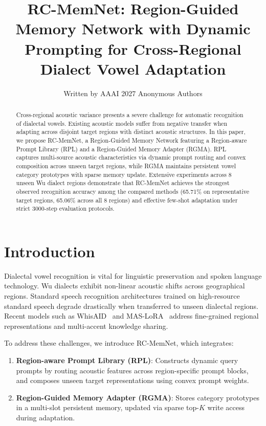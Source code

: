 \documentclass[letterpaper]{article}
\title{RC-MemNet: Region-Guided Memory Network with Dynamic Prompting for Cross-Regional Dialect Vowel Adaptation}
\author{
    Written by AAAI 2027 Anonymous Authors
}
\begin{document}
\maketitle

\begin{abstract}
Cross-regional acoustic variance presents a severe challenge for automatic recognition of dialectal vowels. Existing acoustic models suffer from negative transfer when adapting across disjoint target regions with distinct acoustic structures. In this paper, we propose RC-MemNet, a Region-Guided Memory Network featuring a Region-aware Prompt Library (RPL) and a Region-Guided Memory Adapter (RGMA). RPL captures multi-source acoustic characteristics via dynamic prompt routing and convex composition across unseen target regions, while RGMA maintains persistent vowel category prototypes with sparse memory update. Extensive experiments across 8 unseen Wu dialect regions demonstrate that RC-MemNet achieves the strongest observed recognition accuracy among the compared methods (65.71\% on representative target regions, 65.06\% across all 8 regions) and effective few-shot adaptation under strict 3000-step evaluation protocols.
\end{abstract}

\section{Introduction}
Dialectal vowel recognition is vital for linguistic preservation and spoken language technology. Wu dialects exhibit non-linear acoustic shifts across geographical regions. Standard speech recognition architectures trained on high-resource standard speech degrade drastically when transferred to unseen dialectal regions. Recent models such as WhisAID~\cite{wang2026joycent} and MAS-LoRA~\cite{bagat25_interspeech} address fine-grained regional representations and multi-accent knowledge sharing.

To address these challenges, we introduce RC-MemNet, which integrates:
\begin{enumerate}
    \item \textbf{Region-aware Prompt Library (RPL)}: Constructs dynamic query prompts by routing acoustic features across region-specific prompt blocks, and composes unseen target representations using convex prompt weights.
    \item \textbf{Region-Guided Memory Adapter (RGMA)}: Stores category prototypes in a multi-slot persistent memory, updated via sparse top-$K$ write access during adaptation.
\end{enumerate}
\end{document}
